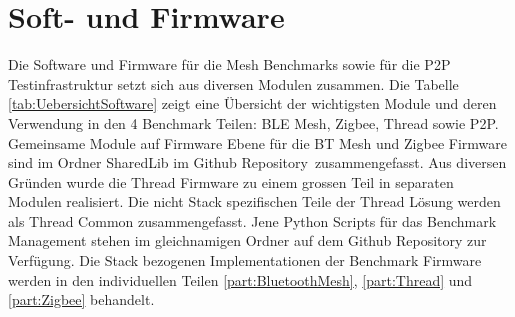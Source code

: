 \clearpage
\section{Soft- und Firmware}\label{sec:Soft-undFirmware}




Die Software und Firmware für die Mesh Benchmarks sowie für die P2P Testinfrastruktur setzt sich aus diversen Modulen zusammen. Die Tabelle \ref{tab:UebersichtSoftware} zeigt eine Übersicht der wichtigsten Module und deren Verwendung in den 4 Benchmark Teilen: BLE Mesh, Zigbee, Thread sowie P2P.
Gemeinsame Module auf Firmware Ebene für die BT Mesh und Zigbee Firmware sind im Ordner SharedLib im Github Repository\footnotemark\ zusammengefasst. Aus diversen Gründen wurde die Thread Firmware zu einem grossen Teil in separaten Modulen realisiert. Die nicht Stack spezifischen Teile der Thread Lösung werden als Thread Common zusammengefasst.
Jene Python Scripts für das Benchmark Management stehen im gleichnamigen Ordner auf dem Github Repository zur Verfügung.
Die Stack bezogenen Implementationen der Benchmark Firmware werden in den individuellen Teilen \ref{part:BluetoothMesh}, \ref{part:Thread} und \ref{part:Zigbee} behandelt.


